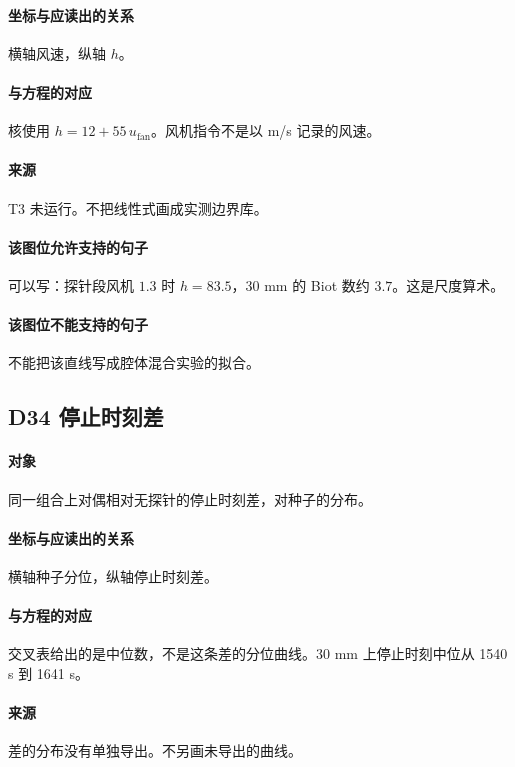 \paragraph{坐标与应读出的关系}
横轴风速，纵轴 $h$。

\paragraph{与方程的对应}
核使用 $h=12+55\,u_{\mathrm{fan}}$。风机指令不是以 m/s 记录的风速。

\paragraph{来源}
T3 未运行。不把线性式画成实测边界库。

\paragraph{该图位允许支持的句子}
可以写：探针段风机 $1.3$ 时 $h=83.5$，30 mm 的 Biot 数约 $3.7$。这是尺度算术。

\paragraph{该图位不能支持的句子}
不能把该直线写成腔体混合实验的拟合。

\subsection{D34 停止时刻差}
\paragraph{对象}
同一组合上对偶相对无探针的停止时刻差，对种子的分布。

\paragraph{坐标与应读出的关系}
横轴种子分位，纵轴停止时刻差。

\paragraph{与方程的对应}
交叉表给出的是中位数，不是这条差的分位曲线。30 mm 上停止时刻中位从 1540 s 到 1641 s。

\paragraph{来源}
差的分布没有单独导出。不另画未导出的曲线。

